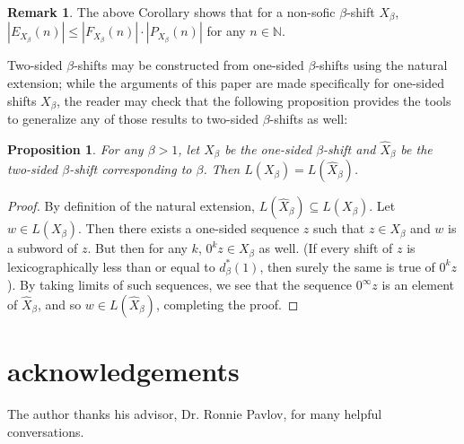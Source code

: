 \documentclass{amsart}
\newtheorem{corollary}[theorem]{Corollary}
\newtheorem{proposition}[theorem]{Proposition}
\theoremstyle{definition}
\newtheorem{remark}[theorem]{Remark}
\numberwithin{equation}{section}
\begin{document}
\begin{remark}
The above Corollary shows that for a non-sofic $\beta$-shift $X_\beta$, $|E_{X_\beta}(n)| \leq |F_{X_\beta}(n)| \cdot |P_{X_\beta}(n)|$ for any $n \in \mathbb{N}$.
\end{remark}




Two-sided $\beta$-shifts may be constructed from one-sided $\beta$-shifts using the natural extension; while the arguments of this paper are made specifically for one-sided shifts $X_\beta$, the reader may check that the following proposition provides the tools to generalize any of those results to two-sided $\beta$-shifts as well:

\begin{proposition}\label{two-sided} 
For any $\beta > 1$, let $X_\beta$ be the one-sided $\beta$-shift and $\widehat{X}_\beta$ be the two-sided $\beta$-shift corresponding to $\beta$. Then $L(X_\beta) = L(\widehat{X}_\beta)$.
\end{proposition}

\begin{proof}
By definition of the natural extension, $L(\widehat{X}_\beta) \subseteq L(X_\beta)$. Let $w \in L(X_\beta)$. Then there exists a one-sided sequence $z$ such that $z \in X_\beta$ and $w$ is a subword of $z$. But then for any $k$, $0^kz \in X_\beta$ as well. (If every shift of $z$ is lexicographically less than or equal to $d_\beta^*(1)$, then surely the same is true of $0^kz$). By taking limits of such sequences, we see that the sequence $0^\infty z$ is an element of $\widehat{X}_\beta$, and so $w \in L(\widehat{X}_\beta)$, completing the proof.
\end{proof}

\section*{acknowledgements} 

The author thanks his advisor, Dr. Ronnie Pavlov, for many helpful conversations.


{}

\end{document}

